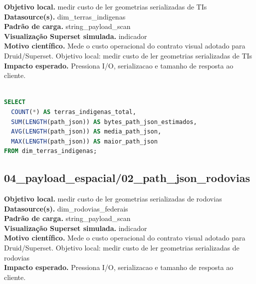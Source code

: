 \documentclass[11pt,a4paper]{article}
\begin{document}
\textbf{Objetivo local.} medir custo de ler geometrias serializadas de TIs\\

\textbf{Datasource(s).} dim\_terras\_indigenas\\

\textbf{Padrão de carga.} string\_payload\_scan\\

\textbf{Visualização Superset simulada.} indicador\\

\textbf{Motivo científico.} Mede o custo operacional do contrato visual adotado para Druid/Superset. Objetivo local: medir custo de ler geometrias serializadas de TIs\\

\textbf{Impacto esperado.} Pressiona I/O, serializacao e tamanho de resposta ao cliente.

\begin{lstlisting}[language=SQL]

SELECT
  COUNT(*) AS terras_indigenas_total,
  SUM(LENGTH(path_json)) AS bytes_path_json_estimados,
  AVG(LENGTH(path_json)) AS media_path_json,
  MAX(LENGTH(path_json)) AS maior_path_json
FROM dim_terras_indigenas;

\end{lstlisting}

\subsection{04\_payload\_espacial/02\_path\_json\_rodovias}

\textbf{Objetivo local.} medir custo de ler geometrias serializadas de rodovias\\

\textbf{Datasource(s).} dim\_rodovias\_federais\\

\textbf{Padrão de carga.} string\_payload\_scan\\

\textbf{Visualização Superset simulada.} indicador\\

\textbf{Motivo científico.} Mede o custo operacional do contrato visual adotado para Druid/Superset. Objetivo local: medir custo de ler geometrias serializadas de rodovias\\

\textbf{Impacto esperado.} Pressiona I/O, serializacao e tamanho de resposta ao cliente.
\end{document}
